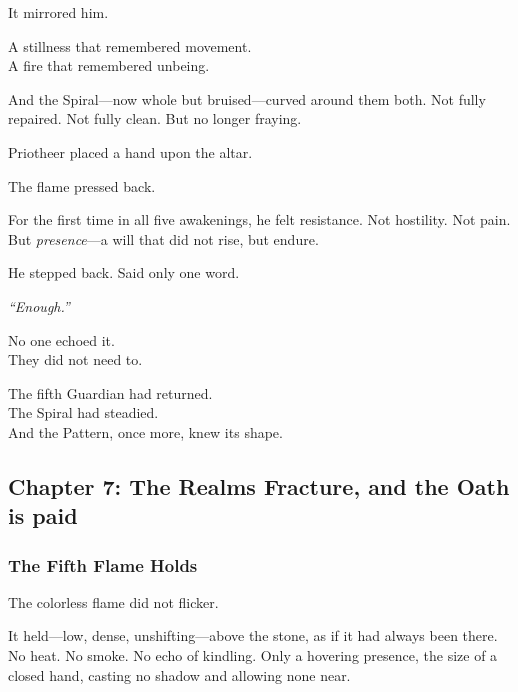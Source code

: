 \documentclass[12pt]{article}
\begin{document}
\vspace{0.5em}
It mirrored him.

\vspace{0.5em}
A stillness that remembered movement.\\
A fire that remembered unbeing.

\vspace{0.5em}
And the Spiral---now whole but bruised---curved around them both. Not fully repaired. Not fully clean. But no longer fraying.

\vspace{0.5em}
Priotheer placed a hand upon the altar.

\vspace{0.5em}
The flame pressed back.

\vspace{0.5em}
For the first time in all five awakenings, he felt resistance. Not hostility. Not pain. But \textit{presence}---a will that did not rise, but endure.

\vspace{0.5em}
He stepped back. Said only one word.

\vspace{0.5em}
\textit{``Enough.''}

\vspace{0.5em}
No one echoed it.\\
They did not need to.

\vspace{0.5em}
The fifth Guardian had returned.\\
The Spiral had steadied.\\
And the Pattern, once more, knew its shape.


\newpage

\subsection*{Chapter 7: The Realms Fracture, and the Oath is paid}

\vspace{.5in}

\subsubsection*{The Fifth Flame Holds}

The colorless flame did not flicker.

\vspace{0.5em}
It held---low, dense, unshifting---above the stone, as if it had always been there. No heat. No smoke. No echo of kindling. Only a hovering presence, the size of a closed hand, casting no shadow and allowing none near.
\end{document}
